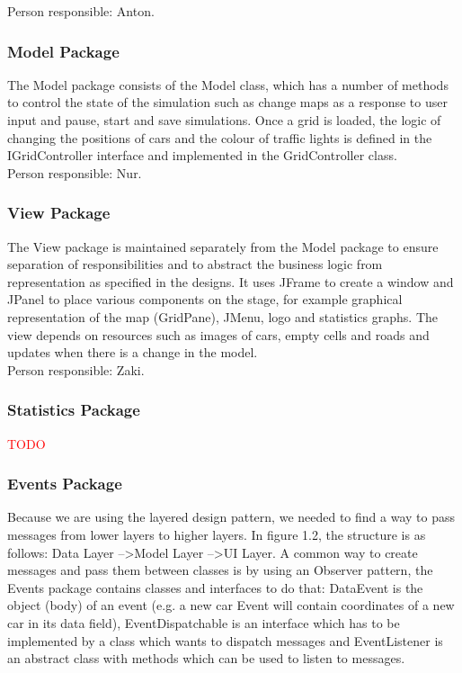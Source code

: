 \documentclass{article}
\begin{document}
	\noindent
	Person responsible: Anton. 

\subsubsection{Model Package}
The Model package consists of the Model class, which has a number of methods to control the state of the simulation such as change maps as a response to user input and pause, start and save simulations. 
Once a grid is loaded, the logic of changing the positions of cars and the colour of traffic lights is defined in the IGridController interface and implemented in the GridController class.\\

\noindent
Person responsible: Nur. 

\subsubsection{View Package}
The View package is maintained separately from the Model package to ensure separation of responsibilities and to abstract the business logic from representation as specified in the designs. 
It uses JFrame to create a window and JPanel to place various components on the stage, for example graphical representation of the map (GridPane), JMenu, logo and statistics graphs. 
The view depends on resources such as images of cars, empty cells and roads and updates when there is a change in the model.\\

\noindent
Person responsible: Zaki.

\subsubsection{Statistics Package}
\textcolor{red}{TODO}

\subsubsection{Events Package}
Because we are using the layered design pattern, we needed to find a way to pass messages from lower layers to higher layers. In figure 1.2, the structure is as follows: Data Layer --\textgreater Model Layer --\textgreater UI Layer. 
A common way to create messages and pass them between classes is by using an Observer pattern, the Events package contains classes and interfaces to do that: DataEvent is the object (body) of an event (e.g. a new car Event will contain coordinates of a new car in its data field), EventDispatchable is an interface which has to be implemented by a class which wants to dispatch messages and EventListener is an abstract class with methods which can be used to listen to messages.\\
\end{document}
